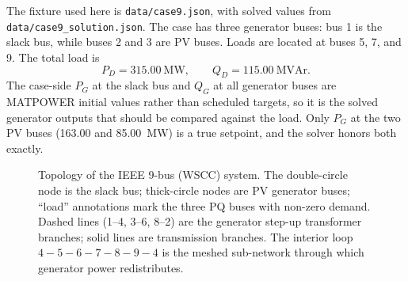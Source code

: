 \documentclass[11pt]{article}
\newcommand{\MW}{\mathrm{MW}}
\newcommand{\MVAr}{\mathrm{MVAr}}
\begin{document}
The fixture used here is \texttt{data/case9.json}, with solved values from
\texttt{data/case9\_solution.json}. The case has three generator buses:
bus 1 is the slack bus, while buses 2 and 3 are PV buses. Loads are
located at buses 5, 7, and 9. The total load is
\[
  P_D = 315.00~\MW, \qquad Q_D = 115.00~\MVAr.
\]
The case-side $P_G$ at the slack bus and $Q_G$ at all generator buses
are MATPOWER initial values rather than scheduled targets, so it is the
solved generator outputs that should be compared against the load. Only
$P_G$ at the two PV buses (163.00 and 85.00~MW) is a true setpoint, and
the solver honors both exactly.

\begin{figure}[htbp]
\centering
{}
\caption{Topology of the IEEE 9-bus (WSCC) system. The double-circle
node is the slack bus; thick-circle nodes are PV generator buses;
``load'' annotations mark the three PQ buses with non-zero demand. Dashed
lines (1--4, 3--6, 8--2) are the generator step-up transformer branches;
solid lines are transmission branches. The interior loop
$4{-}5{-}6{-}7{-}8{-}9{-}4$ is the meshed sub-network through which
generator power redistributes.}
\end{figure}
\end{document}

